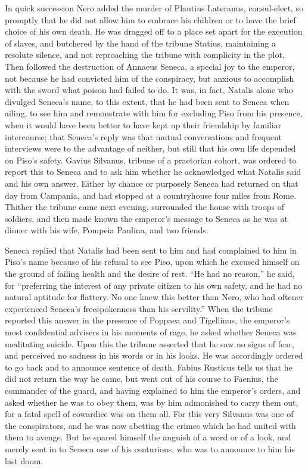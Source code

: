 
In quick succession Nero added the murder of Plautius Lateranus, consul-elect, so promptly that he did not allow him to embrace his children or to have the brief choice of his own death. He was dragged off to a place set apart for the execution of slaves, and butchered by the hand of the tribune Statius, maintaining a resolute silence, and not reproaching the tribune with complicity in the plot. Then followed the destruction of Annaeus Seneca, a special joy to the emperor, not because he had convicted him of the conspiracy, but anxious to accomplish with the sword what poison had failed to do. It was, in fact, Natalis alone who divulged Seneca's name, to this extent, that he had been sent to Seneca when ailing, to see him and remonstrate with him for excluding Piso from his presence, when it would have been better to have kept up their friendship by familiar intercourse; that Seneca's reply was that mutual conversations and frequent interviews were to the advantage of neither, but still that his own life depended on Piso's safety. Gavius Silvanus, tribune of a praetorian cohort, was ordered to report this to Seneca and to ask him whether he acknowledged what Natalis said and his own answer. Either by chance or purposely Seneca had returned on that day from Campania, and had stopped at a countryhouse four miles from Rome. Thither the tribune came next evening, surrounded the house with troops of soldiers, and then made known the emperor's message to Seneca as he was at dinner with his wife, Pompeia Paulina, and two friends.


Seneca replied that Natalis had been sent to him and had complained to him in Piso's name because of his refusal to see Piso, upon which he excused himself on the ground of failing health and the desire of rest. ``He had no reason,'' he said, for ``preferring the interest of any private citizen to his own safety, and he had no natural aptitude for flattery. No one knew this better than Nero, who had oftener experienced Seneca's freespokenness than his servility.'' When the tribune reported this answer in the presence of Poppaea and Tigellinus, the emperor's most confidential advisers in his moments of rage, he asked whether Seneca was meditating suicide. Upon this the tribune asserted that he saw no signs of fear, and perceived no sadness in his words or in his looks. He was accordingly ordered to go back and to announce sentence of death. Fabius Rusticus tells us that he did not return the way he came, but went out of his course to Faenius, the commander of the guard, and having explained to him the emperor's orders, and asked whether he was to obey them, was by him admonished to carry them out, for a fatal spell of cowardice was on them all. For this very Silvanus was one of the conspirators, and he was now abetting the crimes which he had united with them to avenge. But he spared himself the anguish of a word or of a look, and merely sent in to Seneca one of his centurions, who was to announce to him his last doom.

